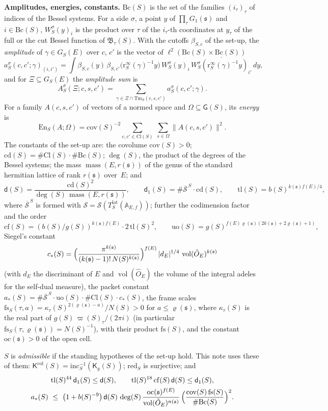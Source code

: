 \documentclass[11pt,a4paper]{article}
\newcommand{\m}[1]{\mbox{$#1$}}        %
\newcommand{\subhead}[1]{\par\addvspace{9pt plus 2pt}\Needspace{4\baselineskip}\noindent\textbf{#1}\enspace\ignorespaces}
\theoremstyle{plainx}
\theoremstyle{uprightx}
\newcommand{\fs}{\mathfrak{s}}                      %
\newcommand{\AEf}{\mathbb{A}_{E,f}}
\newcommand{\hO}{\hat{O}_E}
\newcommand{\rh}[1]{\varrho(#1)}                    %
\newcommand{\kk}[1]{k(#1)}                          %
\newcommand{\nn}[1]{n(#1)}                          %
\newcommand{\rr}[1]{r(#1)}                          %
\newcommand{\ninf}[1]{f(#1)}                        %
\newcommand{\bS}[1]{b(#1)}                          %
\newcommand{\NS}[1]{N(#1)}                          %
\newcommand{\gS}[1]{g(#1)}                          %
\newcommand{\vpS}[1]{\varpi(#1)}                    %
\newcommand{\KcolS}[1]{\mathsf{K}^{\mathrm{col}}(#1)}        %
\newcommand{\BsysS}[2]{\mathfrak{B}_{#2}(#1)}       %
\newcommand{\Tlat}[2]{T^{\mathrm{lat}}_{#1}(#2)}    %
\newcommand{\GS}[2]{G_{#1}(#2)}                     %
\newcommand{\GRes}[1]{\mathsf{G}(#1)}               %
\newcommand{\Cl}[1]{\mathrm{Cl}(#1)}                %
\newcommand{\Bc}[1]{\mathrm{Bc}(#1)}                %
\newcommand{\redS}[1]{\mathrm{red}_{#1}}            %
\newcommand{\KgS}[1]{\mathsf{K}_g(#1)}                       %
\newcommand{\redim}[2]{\overline{#2}^{\,#1}}        %
\newcommand{\kapS}[2]{\kappa_{#2}(#1)}              %
\newcommand{\rinf}[1]{\mathrm{r}^{\infty}_{#1}}     %
\newcommand{\incH}[1]{\mathrm{inc}_{#1}}            %
\newcommand{\terms}[4]{\mathrm{Tm}_{#1}(#2,#3,#4)}  %
\newcommand{\cutoff}[2]{\beta_{#1,#2}}              %
\newcommand{\besfn}[4]{W^{#1}_{#2}(#3)_{#4}}        %
\newcommand{\amp}[5]{a^{#1}_{#2}(#3,#4;#5)}         %
\newcommand{\ampsum}[6]{A^{#1}_{#2}(#3;#4,#5,#6)}   %
\newcommand{\ucov}[1]{\mathrm{cov}(#1)}                      %
\newcommand{\siegC}[1]{c_{*}(#1)}                   %
\newcommand{\packC}[1]{a_{*}(#1)}                   %
\newcommand{\uord}[1]{\mathrm{uo}(#1)}              %
\newcommand{\cdim}[1]{\mathrm{cd}(#1)}              %
\newcommand{\bdeg}[1]{\deg(#1)}                     %
\newcommand{\mainE}[1]{\mathsf{d}(#1)}              %
\newcommand{\besE}[1]{\mathsf{d}_{1}(#1)}           %
\newcommand{\tailS}[1]{\mathrm{tl}(#1)}             %
\newcommand{\codimF}[1]{\mathrm{cf}(#1)}            %
\newcommand{\fscale}[3]{\mathrm{fs}_{#1}(#2,#3)}    %
\newcommand{\fsprod}[1]{\mathrm{fs}(#1)}            %
\newcommand{\mass}[2]{\operatorname{mass}(#1,#2)}   %
\newcommand{\energy}[3]{\mathrm{En}_{#1}(#2;#3)}    %
\newcommand{\vol}{\operatorname{vol}}
\begin{document}
\subhead{Amplitudes, energies, constants.} \m{\Bc{S}} is the set of the families \m{(i_\tau)_\tau} of indices of
the Bessel systems. For a side $\sigma$, a point $y$ of \m{\prod_\tau G_1(\fs)} and \m{i\in\Bc{S}},
\m{\besfn{\sigma}{S}{y}{i}} is the product over $\tau$ of the $i_\tau$-th coordinates at $y_\tau$ of the full or the
cut Bessel function of \m{\BsysS{S}{\tau}}. With the cutoffs \m{\cutoff{S}{c}} of the set-up, the
\emph{amplitude} of \m{\gamma\in\GS{S}{E}} over $c$, $c'$ is the vector of \m{\ell^2(\Bc{S}\times\Bc{S})}
\[\amp{\sigma}{S}{c}{c'}{\gamma}_{(i,i')}=\int\cutoff{S}{c}(y)\,\cutoff{S}{c'}\bigl(\rinf{S}(\gamma)^{-1}y\bigr)\,
\besfn{\sigma}{S}{y}{i}\,\overline{\besfn{\sigma}{S}{\rinf{S}(\gamma)^{-1}y}{i'}}\,dy,\]
and for \m{\Xi\subseteq\GS{S}{E}} the \emph{amplitude sum} is
\[\ampsum{\sigma}{S}{\Xi}{c}{s}{c'}=\sum_{\gamma\in\Xi\cap\terms{S}{c}{s}{c'}}\amp{\sigma}{S}{c}{c'}{\gamma}.\]
For a family \m{A(c,s,c')} of vectors of a normed space and \m{\Omega\subseteq\GRes{S}}, its \emph{energy} is
\[\energy{S}{A}{\Omega}=\ucov{S}^{-2}\sum_{c,c'\in\Cl{S}}\ \sum_{s\in\Omega}\|A(c,s,c')\|^2 .\]
The constants of the set-up are: the covolume \m{\ucov{S}>0}; \m{\cdim{S}=\#\Cl{S}\cdot\#\Bc{S}};
\m{\bdeg{S}}, the product of the degrees of the Bessel systems; the mass \m{\mass{E}{\rr{\fs}}} of the genus of the
standard hermitian lattice of rank \m{\rr{\fs}} over~$E$; and
\[\mainE{S}=\frac{\cdim{S}^2}{\bdeg{S}\,\mass{E}{\rr{\fs}}},\qquad\besE{S}=\#\redim{S}{\mathcal S}\cdot\cdim{S},
\qquad\tailS{S}=\bS{S}^{\kk{\fs}\ninf{E}/4},\]
where \m{\redim{S}{\mathcal S}} is formed with \m{\mathcal S=\mathcal S(\Tlat{S}{\AEf})}; further the
codimension factor and the order
\[\codimF{S}=(\bS{S}/\gS{S})^{\kk{\fs}\ninf{E}}\cdot2\,\tailS{S}^2,\qquad
\uord{S}=\gS{S}^{\ninf{E}\rh{\fs}(2\kk{\fs}+2\rh{\fs}+1)},\]
Siegel's constant
\[\siegC{S}=\Bigl(\frac{\pi^{\kk{\fs}}}{(\kk{\fs}-1)!\,\NS{S}^{\kk{\fs}}}\Bigr)^{\ninf{E}}\,|d_E|^{1/4}\,
\vol(\hO)^{\kk{\fs}}\]
(with $d_E$ the discriminant of $E$ and \m{\vol(\hO)} the volume of the integral adeles for the self-dual
measure), the packet constant \m{\packC{S}=\#\redim{S}{\mathcal S}\cdot\uord{S}\cdot\#\Cl{S}\cdot\siegC{S}}, the
frame scales \m{\fscale{S}{\tau}{a}=\kapS{S}{\tau}^{2(\rh{\fs}-a)}/\NS{S}>0} for \m{a\le\rh{\fs}}, where
\m{\kapS{S}{\tau}} is the real part of \m{\gS{S}\,\vpS{S}_\tau/(2\pi i)} (in particular
\m{\fscale{S}{\tau}{\rh{\fs}}=\NS{S}^{-1}}), with their product \m{\fsprod{S}}, and the constant
\m{\mathrm{oc}(\fs)>0} of the open cell.

$S$ is \emph{admissible} if the standing hypotheses of the set-up hold. This note uses these of them:
\m{\KcolS{S}=\incH{S}^{-1}(\KgS{S})}; \m{\redS{S}} is surjective; and
\begin{gather*}
\tailS{S}^{44}\,\besE{S}\le\mainE{S},\qquad\tailS{S}^{18}\,\codimF{S}\,\mainE{S}\le\besE{S},\\
\packC{S}\ \le\ \bigl(1+\bS{S}^{-9}\bigr)\,\mainE{S}\,\bdeg{S}\,\frac{\mathrm{oc}(\fs)^{\ninf{E}}}{\vol(\hO)^{\nn{\fs}}}\,
\Bigl(\frac{\ucov{S}\,\fsprod{S}}{\#\Bc{S}}\Bigr)^{2}.
\end{gather*}
\end{document}
